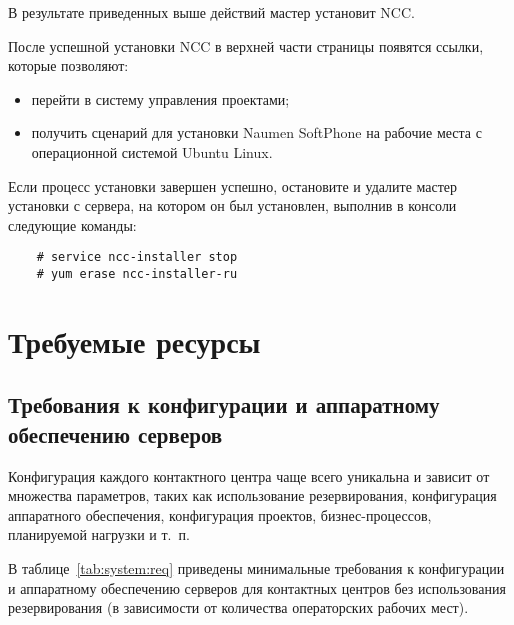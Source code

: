 В результате приведенных выше действий мастер установит NCC\@.

После успешной установки NCC в верхней части страницы появятся ссылки, которые позволяют:
\begin{itemize}
    \item перейти в систему управления проектами;
    \item получить сценарий для установки Naumen SoftPhone на рабочие места с операционной системой Ubuntu Linux.
\end{itemize}

Если процесс установки завершен успешно, остановите и удалите мастер установки с сервера, на котором он был установлен, выполнив в консоли следующие команды:
\begin{verbatim}
    # service ncc-installer stop
    # yum erase ncc-installer-ru
\end{verbatim}

\section{Требуемые ресурсы}

\subsection{Требования к конфигурации и аппаратному обеспечению серверов}
\label{subsec:system:req}

Конфигурация каждого контактного центра чаще всего уникальна и зависит от множества параметров,
таких как использование резервирования, конфигурация аппаратного обеспечения, конфигурация проектов,
бизнес-процессов, планируемой нагрузки и т.~п.

В таблице~\ref{tab:system:req} приведены минимальные требования к конфигурации
и аппаратному обеспечению серверов для контактных центров без использования резервирования
(в зависимости от количества операторских рабочих мест).

